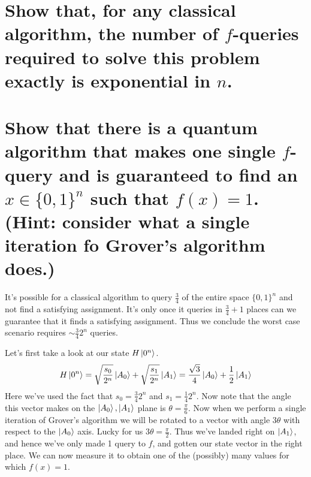\documentclass[boxes,pages]{homework}
\begin{document}
\begin{problem}
\begin{parts}
	\part{Show that, for any classical algorithm, the number of $f$-queries required to solve this problem exactly is exponential in $n$.}\label{part:2a}
	\part{Show that there is a quantum algorithm that makes one single $f$-query and is guaranteed to find an $x\in\{0, 1\}^n$ such that $f(x) = 1$. (Hint: consider what a single iteration fo Grover's algorithm does.)}\label{part:2b}
\end{parts}
\end{problem}

\begin{solution}
	\ref{part:2a}
	It's possible for a classical algorithm to query $\frac{3}{4}$ of the entire space $\{0, 1\}^n$ and not find a satisfying assignment.
	It's only once it queries in $\frac{3}{4} + 1$ places can we guarantee that it finds a satisfying assignment.
	Thus we conclude the worst case scenario requires $\sim \frac{3}{4}2^n$ queries.

	\ref{part:2b}
	Let's first take a look at our state $H\ket{0^n}$.
	\begin{equation*}
		H\ket{0^n} = \sqrt{\frac{s_0}{2^n}}\ket{A_0} + \sqrt{\frac{s_1}{2^n}}\ket{A_1} = \frac{\sqrt{3}}{4}\ket{A_0} + \frac{1}{2}\ket{A_1}
	\end{equation*}
	Here we've used the fact that $s_0 = \frac{3}{4}2^n$ and $s_1 = \frac{1}{4}2^n$.
	Now note that the angle this vector makes on the $\ket{A_0}, \ket{A_1}$ plane is $\theta = \frac{\pi}{6}$.
	Now when we perform a single iteration of Grover's algorithm we will be rotated to a vector with angle $3\theta$ with respect to the $\ket{A_0}$ axis.
	Lucky for us $3\theta = \frac{\pi}{2}$.
	Thus we've landed right on $\ket{A_1}$, and hence we've only made 1 query to $f$, and gotten our state vector in the right place.
	We can now measure it to obtain one of the (possibly) many values for which $f(x) = 1$.
\end{solution}
\end{document}
